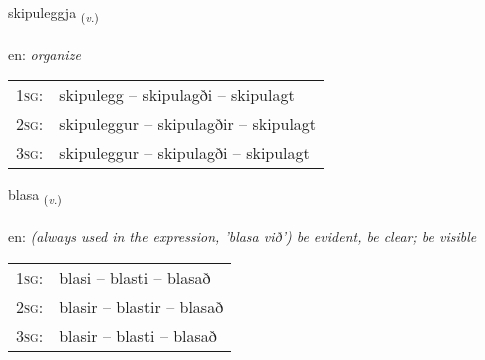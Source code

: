 \documentclass[frontgrid, backgrid]{flacards}\usepackage[]{graphicx}\usepackage[]{color}
\begin{document}
\renewcommand{\flhead}{\vskip5pt \fboxsep=0pt {\small\bfseries\footnotesize Sagnorð | Verb}}
\renewcommand{\fcfoot}{\vskip5pt \fboxsep=0pt \hspace{2pt}{\small\bfseries\footnotesize 2K}}

\renewcommand{\blhead}{\vskip5pt {\small\bfseries\footnotesize Sagnorð | Verb }}
\renewcommand{\bcfoot}{\vskip5pt \hspace{2pt}{\small\bfseries\footnotesize 2K}}


{skipuleggja \small{\textsubscript{(\textit{v.})}} \\[1ex] %
\textphonetic{[scɪːpʏlɛca]} \\
en: \emph{organize} \\  [2ex]
\renewcommand*{\arraystretch}{0.8}
\begin{tabular}{p{1cm}l}
\textsc{1sg}: & skipulegg -- skipulagði -- skipulagt \\ 
\textsc{2sg}: & skipuleggur -- skipulagðir -- skipulagt \\ 
\textsc{3sg}: & skipuleggur -- skipulagði -- skipulagt \\ 
\end{tabular}
}

\renewcommand{\flhead}{\vskip5pt \fboxsep=0pt {\small\bfseries\footnotesize Sagnorð | Verb}}
\renewcommand{\fcfoot}{\vskip5pt \fboxsep=0pt \hspace{2pt}{\small\bfseries\footnotesize 2K}}

\renewcommand{\blhead}{\vskip5pt {\small\bfseries\footnotesize Sagnorð | Verb }}
\renewcommand{\bcfoot}{\vskip5pt \hspace{2pt}{\small\bfseries\footnotesize 2K}}


{blasa \small{\textsubscript{(\textit{v.})}} \\[1ex] %
\textphonetic{[plaːsa]} \\
en: \emph{(always used in the expression, 'blasa við') be evident, be clear; be visible} \\  [2ex]
\renewcommand*{\arraystretch}{0.8}
\begin{tabular}{p{1cm}l}
\textsc{1sg}: & blasi -- blasti -- blasað \\ 
\textsc{2sg}: & blasir -- blastir -- blasað \\ 
\textsc{3sg}: & blasir -- blasti -- blasað \\ 
\end{tabular}
}
\end{document}
